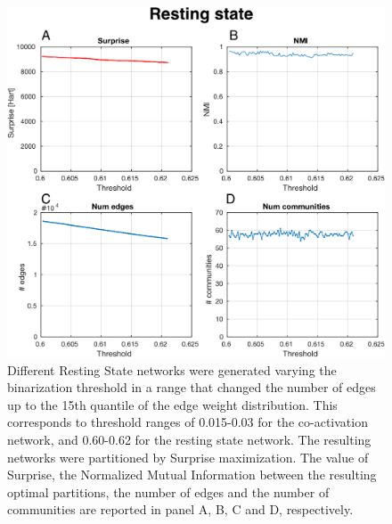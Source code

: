 \begin{figure}[htb!]
\centering
\includegraphics[width=0.7\linewidth]{images/resting_state_study_threshold.pdf}
\caption{Different Resting State networks were generated varying the binarization threshold in a range that changed the number of edges up to the 15th quantile of the edge weight distribution. This corresponds to threshold ranges of 0.015-0.03 for the co-activation network, and 0.60-0.62 for the resting state network. The resulting networks were partitioned by Surprise maximization. The value of Surprise, the Normalized Mutual Information between the resulting optimal partitions, the number of edges and the number of communities are reported in panel A, B, C and D, respectively.}
\label{fig:figure_9_rs_threshold_study}
\end{figure}

